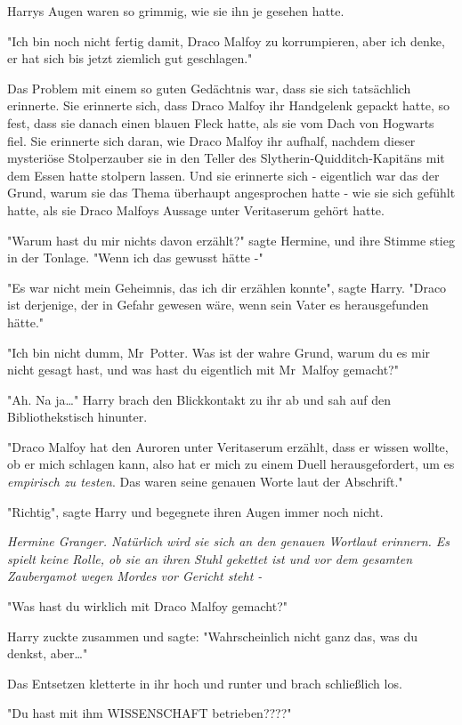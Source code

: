 {Harrys Augen waren so grimmig, wie sie ihn je gesehen hatte.

"Ich bin noch nicht fertig damit, Draco Malfoy zu korrumpieren, aber ich denke, er hat sich bis jetzt ziemlich gut geschlagen."

Das Problem mit einem so guten Gedächtnis war, dass sie sich tatsächlich erinnerte. Sie erinnerte sich, dass Draco Malfoy ihr Handgelenk gepackt hatte, so fest, dass sie danach einen blauen Fleck hatte, als sie vom Dach von Hogwarts fiel. Sie erinnerte sich daran, wie Draco Malfoy ihr aufhalf, nachdem dieser mysteriöse Stolperzauber sie in den Teller des Slytherin-Quidditch-Kapitäns mit dem Essen hatte stolpern lassen. Und sie erinnerte sich - eigentlich war das der Grund, warum sie das Thema überhaupt angesprochen hatte - wie sie sich gefühlt hatte, als sie Draco Malfoys Aussage unter Veritaserum gehört hatte.

"Warum hast du mir nichts davon erzählt?" sagte Hermine, und ihre Stimme stieg in der Tonlage. "Wenn ich das gewusst hätte -"

"Es war nicht mein Geheimnis, das ich dir erzählen konnte", sagte Harry. "Draco ist derjenige, der in Gefahr gewesen wäre, wenn sein Vater es herausgefunden hätte."

"Ich bin nicht dumm, Mr~Potter. Was ist der wahre Grund, warum du es mir nicht gesagt hast, und was hast du eigentlich mit Mr~Malfoy gemacht?"

"Ah. Na ja…" Harry brach den Blickkontakt zu ihr ab und sah auf den Bibliothekstisch hinunter.

"Draco Malfoy hat den Auroren unter Veritaserum erzählt, dass er wissen wollte, ob er mich schlagen kann, also hat er mich zu einem Duell herausgefordert, um es \emph{empirisch zu testen}. Das waren seine genauen Worte laut der Abschrift."

"Richtig", sagte Harry und begegnete ihren Augen immer noch nicht.

\emph{Hermine Granger. Natürlich wird sie sich an den genauen Wortlaut erinnern. Es spielt keine Rolle, ob sie an ihren Stuhl gekettet ist und vor dem gesamten Zaubergamot wegen Mordes vor Gericht steht -}

"Was hast du wirklich mit Draco Malfoy gemacht?"

Harry zuckte zusammen und sagte: "Wahrscheinlich nicht ganz das, was du denkst, aber…"

Das Entsetzen kletterte in ihr hoch und runter und brach schließlich los.

"Du hast mit ihm WISSENSCHAFT betrieben????"

}
